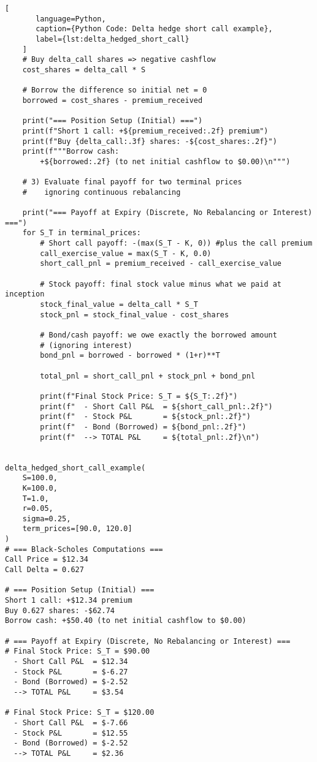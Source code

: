 \begin{lstlisting}[
       language=Python,
       caption={Python Code: Delta hedge short call example},
       label={lst:delta_hedged_short_call}
    ]
    # Buy delta_call shares => negative cashflow
    cost_shares = delta_call * S

    # Borrow the difference so initial net = 0
    borrowed = cost_shares - premium_received

    print("=== Position Setup (Initial) ===")
    print(f"Short 1 call: +${premium_received:.2f} premium")
    print(f"Buy {delta_call:.3f} shares: -${cost_shares:.2f}")
    print(f"""Borrow cash:
        +${borrowed:.2f} (to net initial cashflow to $0.00)\n""")

    # 3) Evaluate final payoff for two terminal prices
    #    ignoring continuous rebalancing

    print("=== Payoff at Expiry (Discrete, No Rebalancing or Interest) ===")
    for S_T in terminal_prices:
        # Short call payoff: -(max(S_T - K, 0)) #plus the call premium
        call_exercise_value = max(S_T - K, 0.0)
        short_call_pnl = premium_received - call_exercise_value

        # Stock payoff: final stock value minus what we paid at inception
        stock_final_value = delta_call * S_T
        stock_pnl = stock_final_value - cost_shares

        # Bond/cash payoff: we owe exactly the borrowed amount
        # (ignoring interest)
        bond_pnl = borrowed - borrowed * (1+r)**T

        total_pnl = short_call_pnl + stock_pnl + bond_pnl

        print(f"Final Stock Price: S_T = ${S_T:.2f}")
        print(f"  - Short Call P&L  = ${short_call_pnl:.2f}")
        print(f"  - Stock P&L       = ${stock_pnl:.2f}")
        print(f"  - Bond (Borrowed) = ${bond_pnl:.2f}")
        print(f"  --> TOTAL P&L     = ${total_pnl:.2f}\n")


delta_hedged_short_call_example(
    S=100.0,
    K=100.0,
    T=1.0,
    r=0.05,
    sigma=0.25,
    term_prices=[90.0, 120.0]
)
# === Black-Scholes Computations ===
Call Price = $12.34
Call Delta = 0.627

# === Position Setup (Initial) ===
Short 1 call: +$12.34 premium
Buy 0.627 shares: -$62.74
Borrow cash: +$50.40 (to net initial cashflow to $0.00)

# === Payoff at Expiry (Discrete, No Rebalancing or Interest) ===
# Final Stock Price: S_T = $90.00
  - Short Call P&L  = $12.34
  - Stock P&L       = $-6.27
  - Bond (Borrowed) = $-2.52
  --> TOTAL P&L     = $3.54

# Final Stock Price: S_T = $120.00
  - Short Call P&L  = $-7.66
  - Stock P&L       = $12.55
  - Bond (Borrowed) = $-2.52
  --> TOTAL P&L     = $2.36

   \end{lstlisting}

